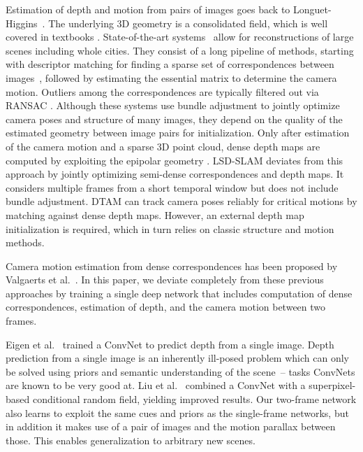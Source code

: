 \documentclass[10pt,twocolumn,letterpaper]{article}
\begin{document}
Estimation of depth and motion from pairs of images goes back to Longuet-Higgins~\cite{longuet-higgins_computer_1981}. The underlying 3D geometry is a consolidated field, which is well covered in textbooks \cite{Hartley2004,Faugeras1993}.
State-of-the-art systems~\cite{frahm_building_2010,wu_towards_2013} allow for reconstructions of large scenes including whole cities. They consist of a long pipeline of methods, starting with 
descriptor matching for finding a sparse set of correspondences between images~\cite{lowe_distinctive_2004}, followed by estimating the essential matrix to determine the camera motion. Outliers among the correspondences are typically filtered out via RANSAC \cite{fischler_random_1981}.
Although these systems use bundle adjustment \cite{triggs_bundle_2000} to jointly optimize camera poses and structure of many images, they 
depend on the quality of the estimated geometry between image pairs for initialization.
Only after estimation of the camera motion and a sparse 3D point cloud, dense depth maps are computed by exploiting the epipolar geometry \cite{collins_space-sweep_1996}. 
LSD-SLAM \cite{engel14eccv} deviates from this approach by jointly optimizing semi-dense correspondences and depth maps. It considers multiple frames from a short temporal window but does not include bundle adjustment.
DTAM \cite{newcombe_dtam:_2011} can track camera poses reliably for critical motions by matching against dense depth maps.
However, an external depth map initialization is required, which in turn relies on classic structure and motion methods.

Camera motion estimation from dense correspondences has been proposed by Valgaerts et al.~\cite{valgaerts_dense_2012}. 
In this paper, we deviate completely from these previous approaches by training a single deep network that includes computation of dense correspondences, estimation of depth, and the camera motion between two frames. 

Eigen et al.~\cite{eigen_predicting_2015} trained a ConvNet to predict depth from a single image.
Depth prediction from a single image is an inherently ill-posed problem which can only be solved using priors and semantic understanding of the scene~-- tasks ConvNets are known to be very good at.
Liu et al.~\cite{liu_learning_2015} combined a ConvNet with a superpixel-based conditional random field, yielding improved results.
Our two-frame network also learns to exploit the same cues and priors as the single-frame networks, but in addition it makes use of a pair of images and the motion parallax between those. 
This enables generalization to arbitrary new scenes. 
\end{document}
